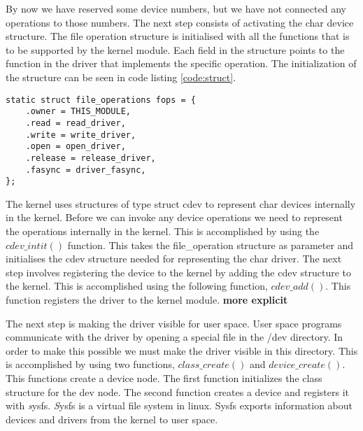 By now we have reserved some device numbers, but we have not connected any operations to those numbers. The next step consists of activating the char device structure. The file operation structure is initialised with all the functions that is to be supported by the kernel module. Each field in the structure points to the function in the driver that implements the specific operation. The initialization of the structure can be seen in code listing \ref{code:struct}. 

\begin{lstlisting}[caption=file operations, label=code:struct]
static struct file_operations fops = {
    .owner = THIS_MODULE,
    .read = read_driver,
    .write = write_driver,
    .open = open_driver,
    .release = release_driver,
    .fasync = driver_fasync,
};
\end{lstlisting}




The kernel uses structures of type struct cdev to represent char devices internally in the kernel. Before we can invoke any device operations we need to represent the operations internally in the kernel. This is accomplished by using the $cdev\_intit()$ function. This takes the file\_operation structure as parameter and initialises the cdev structure needed for representing the char driver. The next step involves registering the device to the kernel by adding the cdev structure to the kernel. This is accomplished using the following function, $cdev\_add()$. This function registers the driver to the kernel module. {\bf more explicit} 

The next step is making the driver visible for user space. User space programs communicate with the driver by opening a special file in the /dev directory. In order to make this possible we must make the driver visible in this directory. This is accomplished by using two functions, $class\_create()$ and $device\_create()$. This functions create a device node. The first function initializes the class structure for the dev node. The second function creates a device and registers it with \emph sysfs. \emph Sysfs is a virtual file system in linux. Sysfs exports information about devices and drivers from the kernel to user space. 


